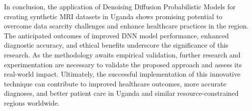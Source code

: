 In conclusion, the application of Denoising Diffusion Probabilistic Models for creating synthetic MRI datasets in Uganda shows promising potential to overcome data scarcity challenges and enhance healthcare practices in the region. The anticipated outcomes of improved DNN model performance, enhanced diagnostic accuracy, and ethical benefits underscore the significance of this research. As the methodology awaits empirical validation, further research and experimentation are necessary to validate the proposed approach and assess its real-world impact. Ultimately, the successful implementation of this innovative technique can contribute to improved healthcare outcomes, more accurate diagnoses, and better patient care in Uganda and similar resource-constrained regions worldwide.
